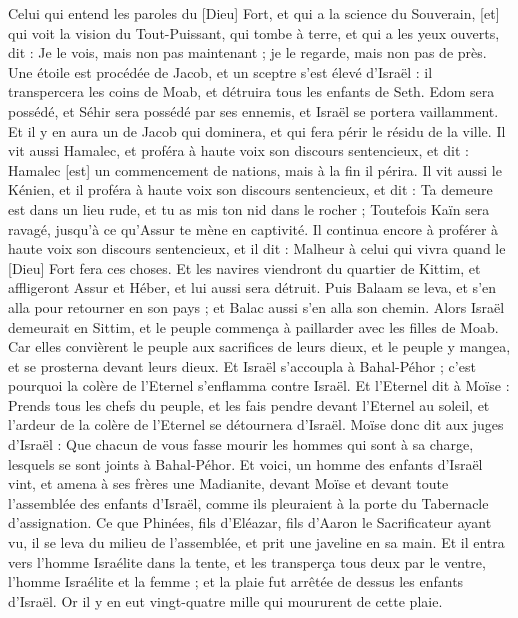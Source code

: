 \begin{multicols}{2}
Celui qui entend les paroles du [Dieu] Fort, et qui a la science du Souverain, [et] qui voit la vision du Tout-Puissant, qui tombe à terre, et qui a les yeux ouverts, dit :
Je le vois, mais non pas maintenant ; je le regarde, mais non pas de près. Une étoile est procédée de Jacob, et un sceptre s'est élevé d'Israël : il transpercera les coins de Moab, et détruira tous les enfants de Seth.
Edom sera possédé, et Séhir sera possédé par ses ennemis, et Israël se portera vaillamment.
Et il y en aura un de Jacob qui dominera, et qui fera périr le résidu de la ville.
Il vit aussi Hamalec, et proféra à haute voix son discours sentencieux, et dit : Hamalec [est] un commencement de nations, mais à la fin il périra.
Il vit aussi le Kénien, et il proféra à haute voix son discours sentencieux, et dit : Ta demeure est dans un lieu rude, et tu as mis ton nid dans le rocher ;
Toutefois Kaïn sera ravagé, jusqu'à ce qu'Assur te mène en captivité.
Il continua encore à proférer à haute voix son discours sentencieux, et il dit : Malheur à celui qui vivra quand le [Dieu] Fort fera ces choses.
Et les navires viendront du quartier de Kittim, et affligeront Assur et Héber, et lui aussi sera détruit.
Puis Balaam se leva, et s'en alla pour retourner en son pays ; et Balac aussi s'en alla son chemin.
\VerseOne{}Alors Israël demeurait en Sittim, et le peuple commença à paillarder avec les filles de Moab.
Car elles convièrent le peuple aux sacrifices de leurs dieux, et le peuple y mangea, et se prosterna devant leurs dieux.
Et Israël s'accoupla à Bahal-Péhor ; c'est pourquoi la colère de l'Eternel s'enflamma contre Israël.
Et l'Eternel dit à Moïse : Prends tous les chefs du peuple, et les fais pendre devant l'Eternel au soleil, et l'ardeur de la colère de l'Eternel se détournera d'Israël.
Moïse donc dit aux juges d'Israël : Que chacun de vous fasse mourir les hommes qui sont à sa charge, lesquels se sont joints à Bahal-Péhor.
Et voici, un homme des enfants d'Israël vint, et amena à ses frères une Madianite, devant Moïse et devant toute l'assemblée des enfants d'Israël, comme ils pleuraient à la porte du Tabernacle d'assignation.
Ce que Phinées, fils d'Eléazar, fils d'Aaron le Sacrificateur ayant vu, il se leva du milieu de l'assemblée, et prit une javeline en sa main.
Et il entra vers l'homme Israélite dans la tente, et les transperça tous deux par le ventre, l'homme Israélite et la femme ; et la plaie fut arrêtée de dessus les enfants d'Israël.
Or il y en eut vingt-quatre mille qui moururent de cette plaie.

\end{multicols}
